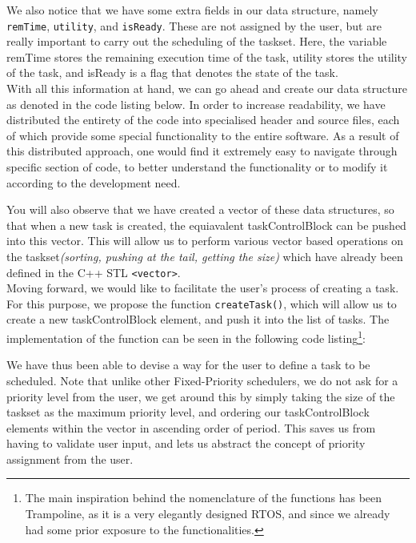 We also notice that we have some extra fields in our data structure, namely \texttt{remTime}, \texttt{utility}, and \texttt{isReady}. These are not assigned by the user, but are really important to carry out the scheduling of the taskset. Here, the variable remTime stores the remaining execution time of the task, utility stores the utility of the task, and isReady is a flag that denotes the state of the task.\\

With all this information at hand, we can go ahead and create our data structure as denoted in the code listing  below. In order to increase readability, we have distributed the entirety of the code into specialised header and source files, each of which provide some special functionality to the entire software. As a result of this distributed approach, one would find it extremely easy to navigate through specific section of code, to better understand the functionality or to modify it according to the development need.



You will also observe that we have created a vector of these data structures, so that when a new task is created, the equiavalent taskControlBlock can be pushed into this vector. This will allow us to perform various vector based operations on the taskset\textit{(sorting, pushing at the tail, getting the size)} which have already been defined in the C++ STL \texttt{<vector>}.\\

Moving forward, we would like to facilitate the user's process of creating a task. For this purpose, we propose the function \texttt{createTask()}, which will allow us to create a new taskControlBlock element, and push it into the list of tasks. The implementation of the function can be seen in the following code listing\footnote{The main inspiration behind the nomenclature of the functions has been Trampoline, as it is a very elegantly designed RTOS, and since we already had some prior exposure to the functionalities.}:



We have thus been able to devise a way for the user to define a task to be scheduled. Note that unlike other Fixed-Priority schedulers, we do not ask for a priority level from the user, we get around this by simply taking the size of the taskset as the maximum priority level, and ordering our taskControlBlock elements within the vector in ascending order of period. This saves us from having to validate user input, and lets us abstract the concept of priority assignment from the user.\\

